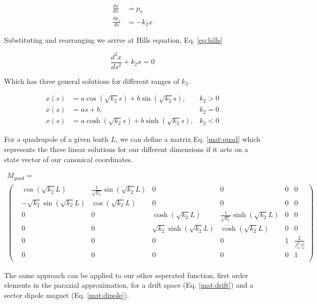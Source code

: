 \begin{equation} \label{eq:quad_diffeq}
\begin{split}
	\frac{dx}{ds} &= p_x\\ 
	\frac{dp_x}{ds} &= -k_2 x
\end{split}
\end{equation}

Substituting and rearranging we arrive at Hills equation, Eq. \ref{eq:hills}

\begin{equation} \label{eq:hills}
	\frac{d^2 x}{ds^2} + k_2 x = 0
\end{equation}

Which has three general solutions for different ranges of $k_2$.

\begin{align} \label{eq:hillSol}
	x(s) &= a \cos{\left(\sqrt{k_2} s\right)} + b \sin{\left(\sqrt{k_2} s\right)}, &k_2>0\\
	x(s) &= a s + b, &k_2 =0 \\
	x(s) &= a \cosh{\left(\sqrt{k_2} s\right)} + b \sinh{\left(\sqrt{k_2} s\right)}, &k_2<0
\end{align}

For a quadrupole of a given lenth $L$, we can define a matrix Eq. \ref{mat:quad} which represents the three linear solutions for our different dimensions if it acts on a state vector of our canonical coordinates.

\begin{multline} \label{mat:quad}
	M_{quad} = \\
\begin{pmatrix} 
	&\cos{\left(\sqrt{k_2} L\right)} &\frac{1}{\sqrt{k_2}}\sin{\left(\sqrt{k_2} L\right)} &0 &0 &0 &0\\
	&-\sqrt{k_2}\sin{\left(\sqrt{k_2} L\right)} &\cos{\left(\sqrt{k_2} L\right)} &0 &0 &0 &0\\
	&0 &0 &\cosh{\left(\sqrt{k_2} L\right)} &\frac{1}{\sqrt{k_2}}\sinh{\left(\sqrt{k_2} L\right)} &0 &0\\
	&0 &0 &\sqrt{k_2}\sinh{\left(\sqrt{k_2} L\right)} &\cosh{\left(\sqrt{k_2} L\right)} &0 &0\\
	&0 &0 &0 &0 &1 &\frac{L}{\beta_o^2\gamma_o^2}\\
	&0 &0 &0 &0 &0 &1\\
\end{pmatrix}
\end{multline}

The same approach can be applied to our other seperated function, first order elements in the paraxial approximation, for a drift space (Eq. \ref{mat:drift}) and a sector dipole magnet (Eq. \ref{mat:dipole}).


